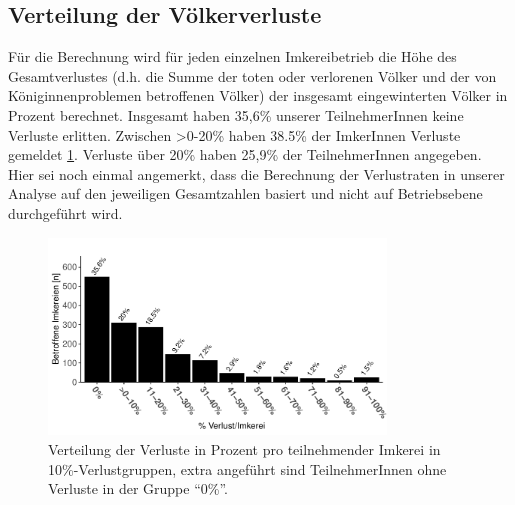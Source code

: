 

\subsection{Verteilung der Völkerverluste}

Für die Berechnung wird für jeden einzelnen Imkereibetrieb die Höhe des Gesamtverlustes (d.h. die Summe der toten oder verlorenen Völker und der von Königinnenproblemen betroffenen Völker) der insgesamt eingewinterten Völker in Prozent berechnet. Insgesamt haben 35,6\% unserer TeilnehmerInnen keine Verluste erlitten. Zwischen >0-20\% haben  38.5\% der ImkerInnen Verluste gemeldet \cref{fig:u:loss:distribution}. Verluste über 20\% haben 25,9\% der TeilnehmerInnen angegeben. Hier sei noch einmal angemerkt, dass die Berechnung der Verlustraten in unserer Analyse auf den jeweiligen Gesamtzahlen basiert und nicht auf Betriebsebene durchgeführt wird.

\begin{figure}[H]
  \centering
  \includegraphics[keepaspectratio,width=0.8\textwidth]{project-U-wintersterblichkeit/figures/plot_overview_loss_dist}
  \caption{Verteilung der Verluste in Prozent pro teilnehmender Imkerei in 10\%-Verlustgruppen, extra angeführt sind TeilnehmerInnen ohne Verluste in der Gruppe \enquote{0\%}.}
  \label{fig:u:loss:distribution}
\end{figure}

